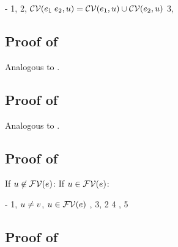 \begin{derivation}
\step{\esbsokO{\appO}}
     {\hyp}
\step{\efvar{\exprI}\cap\cvarvO{\appO}=\emptyset}
     {1, }
     {2, $\mathcal{CV}(e_1\;e_2,u)=\mathcal{CV}(e_1,u)\cup\mathcal{CV}(e_2,u)$}
     {3, }
\end{derivation}



\subsection*{Proof of }

Analogous to .



\subsection*{Proof of }

Analogous to .



\subsection*{Proof of }

If $u\not\in\mathcal{FV}(e)$:
\StepO{\esbsokO{\expr}}
      {}
If $u\in\mathcal{FV}(e)$:
\begin{derivation}
\step{\esbsokO{\absO}}
     {\hyp}
\step{\efvar{\exprI}\cap\cvarvO{\absO}=\emptyset}
     {1, }
\step{\varI\in\efvar{\expr}-\setI{\var}}
     {$u\neq v$, $u\in\mathcal{FV}(e)$}
\step{\efvar{\exprI}\cap(\setI{\var}\cup\cvarvO{\expr})=\emptyset}
     {, 3, 2}
\step{\efvar{\expr}\cap\cvarvO{\expr}=\emptyset}
     {4}
\step{\esbsokO{\expr}}
     {, 5}
\end{derivation}



\subsection*{Proof of }

